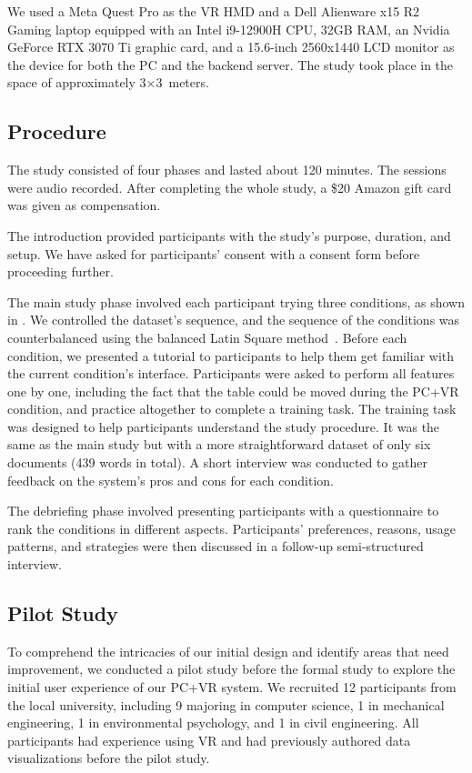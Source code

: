 We used a Meta Quest Pro as the VR HMD and a Dell Alienware x15 R2 Gaming laptop equipped with an Intel i9-12900H CPU, 32GB RAM, an Nvidia GeForce RTX 3070 Ti graphic card, and a 15.6-inch 2560x1440 LCD monitor as the device for both the PC and the backend server.
The study took place in the space of approximately 3$\times$3~meters.

\subsection{Procedure}
The study consisted of four phases and lasted about 120 minutes. The sessions were audio recorded. After completing the whole study, a \$20 Amazon gift card was given as compensation.

 The introduction provided participants with the study's purpose, duration, and setup. We have asked for participants' consent with a consent form before proceeding further.

 The main study phase involved each participant trying three conditions, as shown in . 
We controlled the dataset's sequence, and the sequence of the conditions was counterbalanced using the balanced Latin Square method~\cite{bradley1958complete}. Before each condition, we presented a tutorial to participants to help them get familiar with the current condition's interface. Participants were asked to perform all features one by one, including the fact that the table could be moved during the PC+VR condition, and practice altogether to complete a training task.
The training task was designed to help participants understand the study procedure. It was the same as the main study but with a more straightforward dataset of only six documents (439 words in total).
A short interview was conducted to gather feedback on the system's pros and cons for each condition.

 The debriefing phase involved presenting participants with a questionnaire to rank the conditions in different aspects. Participants' preferences, reasons, usage patterns, and strategies were then discussed in a follow-up semi-structured interview.


\subsection{Pilot Study}
To comprehend the intricacies of our initial design and identify areas that need improvement, we conducted a pilot study before the formal study to explore the initial user experience of our PC+VR system. 
We recruited 12 participants from the local university, including 9 majoring in computer science, 1 in mechanical engineering, 1 in environmental psychology, and 1 in civil engineering. All participants had experience using VR and had previously authored data visualizations before the pilot study.

